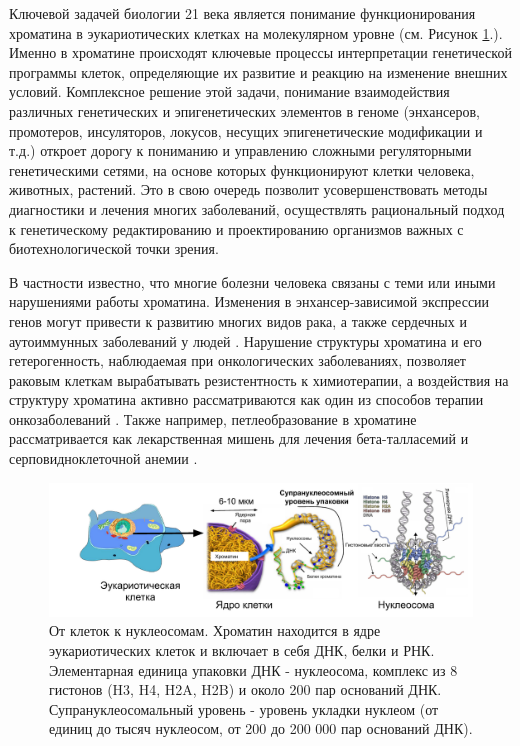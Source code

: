     
    

    Ключевой задачей биологии 21 века является понимание функционирования хроматина в эукариотических клетках на молекулярном уровне (см. Рисунок \ref{fig:p6_1_f1}.). Именно в хроматине происходят ключевые процессы интерпретации генетической программы клеток, определяющие их развитие и реакцию на изменение внешних условий. Комплексное решение этой задачи, понимание взаимодействия различных генетических и эпигенетических элементов в геноме (энхансеров, промотеров, инсуляторов, локусов, несущих эпигенетические модификации и т.д.) откроет дорогу к пониманию и управлению сложными регуляторными генетическими сетями, на основе которых функционируют клетки человека, животных, растений. Это в свою очередь позволит усовершенствовать методы диагностики и лечения многих заболеваний, осуществлять рациональный подход к генетическому редактированию и проектированию организмов важных с биотехнологической точки зрения.
    
    В частности известно, что многие болезни человека связаны с теми или иными нарушениями работы хроматина. Изменения в энхансер-зависимой экспрессии генов могут привести к развитию многих видов рака, а также сердечных и аутоиммунных заболеваний у людей \cite{nizovtseva_towards_2017}. Нарушение структуры хроматина и его гетерогенность, наблюдаемая при онкологических заболеваниях, позволяет раковым клеткам вырабатывать резистентность к химиотерапии, а воздействия на структуру хроматина активно рассматриваются как один из способов терапии онкозаболеваний \cite{almassalha_macrogenomic_2017}. Также например, петлеобразование в хроматине рассматривается как  лекарственная мишень для лечения бета-талласемий и серповидноклеточной анемии  \cite{krivega_chromatin_2016}.
    
\begin{figure} [H]
    \centering
    \includegraphics[width=\textwidth]{images/p6/p6_1_vved/p6_1_f1.pdf}
    \caption[От клеток к нуклеосомам.]{От клеток к нуклеосомам. Хроматин находится в ядре эукариотических клеток и включает в себя ДНК, белки и РНК. Элементарная единица упаковки ДНК - нуклеосома, комплекс из 8 гистонов (H3, H4, H2A, H2B) и около 200 пар оснований ДНК. Супрануклеосомальный уровень - уровень укладки нуклеом (от единиц до тысяч нуклеосом, от 200 до 200 000 пар оснований ДНК).}
    \label{fig:p6_1_f1}
\end{figure}
    
